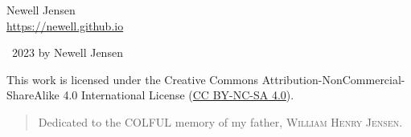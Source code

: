 \documentclass[twoside,11pt]{report}
\begin{document}
\onehalfspacing


%       



\pagecolor{background}
\thispagestyle{empty}

Newell Jensen\\
\url{https://newell.github.io}
\vspace*{\fill}

\large{\textcopyright\ 2023 by Newell Jensen}

\hfill

\hfill

\centerline{\ccbyncsa}

\begin{center}
  \large{This work is licensed under the Creative Commons Attribution-NonCommercial-ShareAlike 4.0 International License (\href{https://creativecommons.org/licenses/by-nc-sa/4.0/}{CC BY-NC-SA 4.0}).}
\end{center}
\vspace*{\fill}
\newpage

\thispagestyle{empty}

\vspace*{\fill}
\begin{quote}
  \centering
  \Large{Dedicated to the \textsc{COL{\color{cred}{O}}{\color{cblue}{U}}{\color{cyellow}{R}}FUL} memory of my father, \LARGE{\textsc{William Henry Jensen}}.}\\
\end{quote}
\vspace*{\fill}
\newpage
\end{document}
